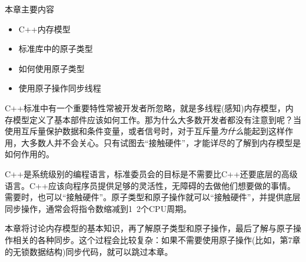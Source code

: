
本章主要内容

\begin{itemize}
    \item C++内存模型
    \item 标准库中的原子类型
    \item 如何使用原子类型
    \item 使用原子操作同步线程
\end{itemize}


C++标准中有一个重要特性常被开发者所忽略，就是多线程(感知)内存模型，内存模型定义了基本部件应该如何工作。那为什么大多数开发者都没有注意到呢？当使用互斥量保护数据和条件变量，或者信号时，对于互斥量\textit{为什么}能起到这样作用，大多数人并不会关心。只有试图去“接触硬件”，才能详尽的了解到内存模型是如何作用的。

C++是系统级别的编程语言，标准委员会的目标是不需要比C++还要底层的高级语言。C++应该向程序员提供足够的灵活性，无障碍的去做他们想要做的事情。需要时，也可以“接触硬件”。原子类型和原子操作就可以“接触硬件”，并提供底层同步操作，通常会将指令数缩减到1~2个CPU周期。

本章将讨论内存模型的基本知识，再了解原子类型和原子操作，最后了解与原子操作相关的各种同步。这个过程会比较复杂：如果不需要使用原子操作(比如，第7章的无锁数据结构)同步代码，就可以跳过本章。
